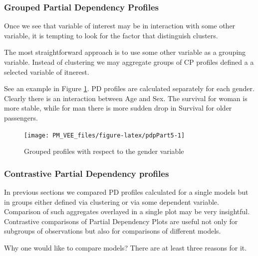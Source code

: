 \documentclass[12pt,]{krantz}
\begin{document}
\hypertarget{grouped-partial-dependency-profiles}{%
\subsubsection{Grouped Partial Dependency Profiles}\label{grouped-partial-dependency-profiles}}

Once we see that variable of interest may be in interaction with some other variable, it is tempting to look for the factor that distinguish clusters.

The most straightforward approach is to use some other variable as a grouping variable.
Instead of clustering we may aggregate groups of CP profiles defined a a selected variable of itnerest.

See an example in Figure \ref{fig:pdpPart5}. PD profiles are calculated separately for each gender. Clearly there is an interaction between Age and Sex. The survival for woman is more stable, while for man there is more sudden drop in Survival for older passengers.

\begin{figure}

{\centering \texttt{[image: PM\_VEE\_files/figure-latex/pdpPart5-1]} 

}

\caption{Grouped profiles with respect to the gender variable}\label{fig:pdpPart5}
\end{figure}

\hypertarget{contrastive-partial-dependency-profiles}{%
\subsubsection{Contrastive Partial Dependency profiles}\label{contrastive-partial-dependency-profiles}}

In previous sections we compared PD profiles calculated for a single models but in groups either defined via clustering or via some dependent variable. Comparison of such aggregates overlayed in a single plot may be very insightful.
Contrastive comparisons of Partial Dependency Plots are useful not only for subgroups of observations but also for comparisons of different models.

Why one would like to compare models? There are at least three reasons for it.
\end{document}
